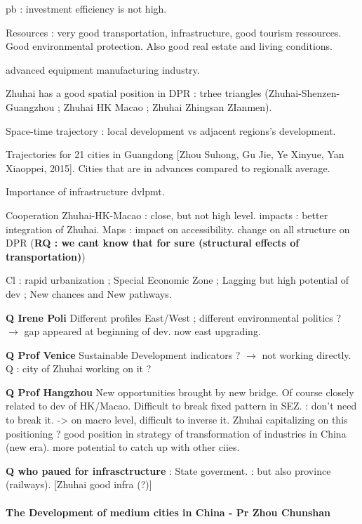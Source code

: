 pb : investment efficiency is not high.

Resources : very good transportation, infrastructure, good tourism ressources. Good environmental protection. Also good real estate and living conditions.

advanced equipment manufacturing industry.

Zhuhai has a good spatial position in DPR : trhee triangles (Zhuhai-Shenzen-Guangzhou ; Zhuhai HK Macao ; Zhuhai Zhingsan ZIanmen).

Space-time trajectory : local development vs adjacent regions's development. 

Trajectories for 21 cities in Guangdong [Zhou Suhong, Gu Jie, Ye Xinyue, Yan Xiaoppei, 2015]. Cities that are in advances compared to regionalk average.

Importance of infrastructure dvlpmt.

Cooperation Zhuhai-HK-Macao : close, but not high level.
impacts : better integration of Zhuhai.
Maps : impact on accessibility. change on all structure on DPR (\textbf{RQ : we cant know that for sure (structural effects of transportation)})

Cl : rapid urbanization ; Special Economic Zone ; Lagging but high potential of dev ; New chances and New pathways.

\textbf{Q Irene Poli} Different profiles East/West ; different environmental politics ? $\rightarrow$ gap appeared at beginning of dev. now east upgrading. 


\textbf{Q Prof Venice} Sustainable Development indicators ? $\rightarrow$ not working directly. Q : city of Zhuhai working on it ?

\textbf{Q Prof Hangzhou} New opportunities brought by new bridge. Of course closely related to dev of HK/Macao. Difficult to break fixed pattern in SEZ. : don't need to break it.
-> on macro level, difficult to inverse it. Zhuhai capitalizing on this positioning ? good position in strategy of transformation of industries in China (new era). more potential to catch up with other ciies. 

\textbf{Q who paued for infrasctructure} : State goverment. : but also province (railways). [Zhuhai good infra (?)]





\paragraph{The Development of medium cities in China - Pr Zhou Chunshan}

